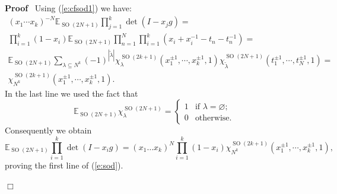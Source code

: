 \documentclass[11pt]{amsart}
\newcommand{\tmop}[1]{\ensuremath{\operatorname{#1}}}
\renewenvironment{proof}{
\noindent\textbf{Proof}\ }{\hspace*{\fill}
\begin{math}\Box\end{math}\medskip}
\begin{document}
\begin{proof}
  Using (\ref{e:cfsod1}) we have:
  \begin{eqnarray*}
    ( x_1 \cdots x_k )^{- N} \mathbb{E}_{\tmop{SO} ( 2 N + 1 )} \prod_{j =
    1}^k \det ( I - x_j g ) = &  & \\
    \prod_{i = 1}^k ( 1 - x_i ) \mathbb{E}_{\tmop{SO} ( 2 N + 1 )} \prod_{n =
    1}^N \prod_{i = 1}^k ( x_i + x_i^{- 1} - t_n - t_n^{- 1} ) = &  & \\
    \mathbb{E}_{\tmop{SO} ( 2 N + 1 )} \sum_{\lambda \subseteq N^k} ( - 1 )^{|
    \tilde{\lambda} |} \chi_{\lambda}^{\tmop{SO} ( 2 k + 1 )} ( x_1^{\pm 1},
    \cdots, x_k^{\pm 1}, 1 ) \chi_{\tilde{\lambda}}^{\tmop{SO} ( 2 N + 1 )} (
    t_1^{\pm 1}, \cdots, t_N^{\pm 1}, 1 ) = &  & \\
    \chi_{N^k}^{\tmop{SO} ( 2 k + 1 )} ( x_1^{\pm 1}, \cdots, x_k^{\pm 1}, 1 )
    . &  &
  \end{eqnarray*}
  In the last line we used the fact that
  \[ \mathbb{E}_{\tmop{SO} ( 2 N + 1 )} \chi_{\lambda}^{\tmop{SO} ( 2 N + 1 )}
     = \left\{\begin{array}{ll}
       1 & \text{if $\lambda =$} \varnothing ;\\
       0 & \text{otherwise} .
     \end{array}\right. \]
  Consequently we obtain
  \begin{equation}
    \label{e:sod12} \mathbb{E}_{\tmop{SO} ( 2 N + 1 )} \prod_{i = 1}^k \det (
    I - x_i g ) = ( x_1 \ldots x_k )^N \prod_{i = 1}^k ( 1 - x_i )
    \chi_{N^k}^{\tmop{SO} ( 2 k + 1 )} ( x_1^{\pm 1}, \cdots, x_k^{\pm 1}, 1
    ),
  \end{equation}
  proving the first line of (\ref{e:sod}).


\end{proof}
\end{document}
